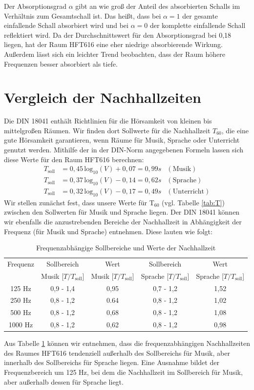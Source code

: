 Der Absorptionsgrad $\alpha$ gibt an wie groß der Anteil des absorbierten Schalls im Verhältnis zum Gesamtschall ist.
Das heißt, dass bei $\alpha = 1$ der gesamte einfallende Schall absorbiert wird und bei $\alpha = 0$ der komplette einfallende Schall reflektiert wird.
Da der Durchschnittswert für den Absorptionsgrad bei 0,18 liegen, hat der Raum HFT616 eine eher niedrige absorbierende Wirkung.
Außerdem lässt sich ein leichter Trend beobachten, dass der Raum höhere Frequenzen besser absorbiert als tiefe.

\section{Vergleich der Nachhallzeiten}
\label{sec:ts}
Die DIN 18041 \cite{DIN_18041} enthält Richtlinien für die Hörsamkeit von kleinen bis mittelgroßen Räumen. 
Wir finden dort Sollwerte für die Nachhallzeit $T_{60}$, die eine gute Hörsamkeit garantieren, wenn Räume für Musik, Sprache oder Unterricht genutzt werden.
Mithilfe der in der DIN-Norm angegebenen Formeln lassen sich diese Werte für den Raum HFT616 berechnen:
\begin{align*}
T_{\mathrm{soll}} &= 0,45\, \mathrm{log}_{10} (V)+0,07 = 0,99 s & \mathrm{(Musik)}\\
T_{\mathrm{soll}} &= 0,37\, \mathrm{log}_{10} (V)-0,14 = 0,62 s & \mathrm{(Sprache)} \\
T_{\mathrm{soll}} &= 0,32\, \mathrm{log}_{10} (V)-0,17 = 0,49 s& \mathrm{(Unterricht)}
\end{align*}
Wir stellen zunächst fest, dass unsere Werte für T$_{60}$ (vgl. Tabelle \ref{tab:T}) zwischen den Sollwerten für Musik und Sprache liegen. 
Der DIN 18041 können wir ebenfalls die anzustrebenden Bereiche der Nachhallzeit in Abhängigkeit der Frequenz (für Musik und Sprache) entnehmen. Diese lauten wie folgt:
\begin{table}[H]
    \centering
    \caption{Frequenzabhängige Sollbereiche und Werte der Nachhallzeit}
    \label{tab:Tsoll}
    \begin{tabular}[\textwidth]{|c|c|c|c|c|}
    \hline
        Frequenz & Sollbereich& Wert&Sollbereich &Wert\\
        & Musik [$T/T_{\mathrm{soll}}$] & Musik [$T/T_{\mathrm{soll}}$] & Sprache [$T/T_{\mathrm{soll}}$]  & Sprache [$T/T_{\mathrm{soll}}$] \\
        \hline
        125 Hz &0,9 - 1,4 & 0,95 &0,7 - 1,2  & 1,52  \\
        250 Hz &0,8 - 1,2 & 0.64 &0,8 - 1,2 & 1,02 \\
        500 Hz &0,8 - 1,2 &0,68 &0,8 - 1,2 &1,08 \\
        1000 Hz & 0,8 - 1,2 & 0,62& 0,8 - 1,2& 0,98 \\
        \hline
    \end{tabular}
\end{table}
Aus Tabelle \ref{tab:Tsoll} können wir entnehmen, dass die frequenzabhängigen Nachhallzeiten des Raumes HFT616 tendenziell außerhalb des Sollbereichs für Musik, aber innerhalb des Sollbereichs für Sprache liegen. Eine Ausnahme bildet der Frequenzbereich um 125 Hz, bei dem die Nachhallzeit im Sollbereich für Musik, aber außerhalb dessen für Sprache liegt. 

